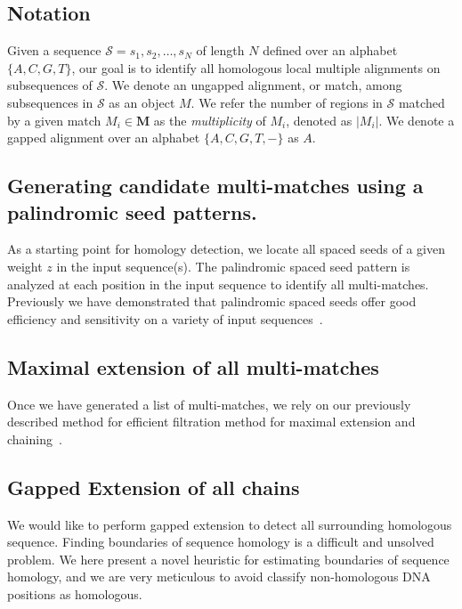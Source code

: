 \documentclass{llncs}
\begin{document}



\subsection{Notation}
Given a sequence $\mathcal{S}=s_1, s_2,\dots, s_N$ of length $N$
defined over an alphabet $\{A,C,G,T\}$, our goal is to identify all homologous
local multiple alignments on subsequences of $\mathcal{S}$. We denote
an ungapped alignment, or match, among subsequences in $\mathcal{S}$
as an object $M$.  We refer the number of regions in $\mathcal{S}$
matched by a given match $M_i \in \mathbf{M}$ as the
\textit{multiplicity} of $M_i$, denoted as $|M_i|$. We denote
a gapped alignment over an alphabet $\{A,C,G,T,-\}$ as $A$. 

\subsection{Generating candidate multi-matches using a palindromic seed patterns.}

As a starting point for homology detection, we locate all spaced seeds of a given weight $z$ in the input sequence(s). The palindromic spaced seed pattern is analyzed at each position in the input sequence to identify all multi-matches.  Previously we have demonstrated that palindromic spaced seeds offer good efficiency and sensitivity on a variety of input sequences~\cite{ref-procrast}. 

\subsection{Maximal extension of all multi-matches}

Once we have generated a list of multi-matches, we rely on our previously described method for efficient filtration method for maximal extension and chaining~\cite{ref-procrast}. 


\subsection{Gapped Extension of all chains}
We would like to perform gapped
extension to detect all surrounding homologous sequence. Finding boundaries of sequence homology is a difficult and unsolved problem. We here present a novel heuristic for estimating boundaries of sequence homology, and we are very meticulous to avoid classify non-homologous DNA positions as homologous.
\end{document}
